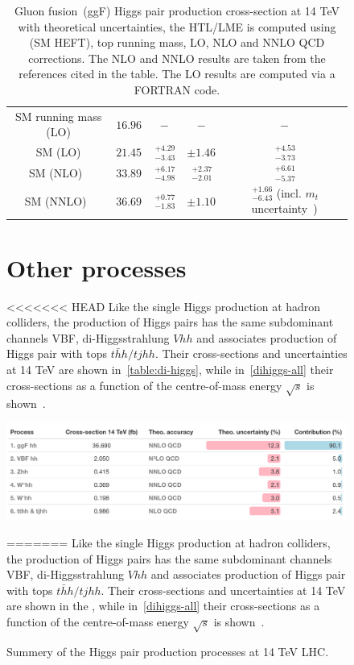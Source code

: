 \begin{figure}[!htpb]
\begin{table}
\begin{tabular}{ccccc}
		SM   running mass (LO)  &  $ 16.96$    &   $ -$   & $-$   &  $-$ \\
		SM    (LO)  &  $ 21.45$    &   $ \,^{+4.29}_{-3.43}$   & $\pm 1.46$   &  $ \,^{+4.53}_{-3.73}$ \\
		SM   (NLO)~\cite{Baglio:2012np}  &  $ 33.89$   &   $ \,^{+6.17}_{-4.98}$   & $ \,^{+2.37}_{-2.01}$   &  $ \,^{+6.61}_{-5.37}$ \\
		SM   (NNLO)~\cite{Grazzini:2018bsd}  &  $36.69$    &    $ \,^{+0.77}_{-1.83}$   & $\pm 1.10$   &  $ \,^{+1.66}_{-6.43}$ {\tiny(incl. $m_t$ uncertainty~\cite{Baglio:2020wgt})} \\
		\bottomrule
	\end{tabular}
	\caption{Gluon fusion~(ggF) Higgs pair production cross-section at 14 TeV with theoretical  uncertainties, the HTL/LME is computed using (SM HEFT), top running mass, LO, NLO and NNLO QCD corrections. The NLO and NNLO results are taken from the references cited in the table. The LO results are computed via a FORTRAN code.}
		\label{ggf_xsres}
\end{table}

\section{Other processes\label{otherhh}  }
<<<<<<< HEAD
Like the single Higgs production at hadron colliders, the production of Higgs pairs has the same subdominant channels VBF, di-Higgsstrahlung $ Vhh$ and associates production of Higgs pair with tops $t\bar hh /t j hh$. Their cross-sections and uncertainties at 14 TeV are shown in~\autoref{table:di-higgs}, while in~\autoref{dihiggs-all} their cross-sections as a function of the centre-of-mass energy $\sqrt{s}$ is shown~\cite{DiMicco:2019ngk}. 
\begin{table}[htbp!]
	\includegraphics[width=1\textwidth]{hh-table}
	\caption{ Summery of the Higgs pair production processes at 14 TeV LHC. \label{table:di-higgs} }
\end{table}
=======
Like the single Higgs production at hadron colliders, the production of Higgs pairs has the same subdominant channels VBF, di-Higgsstrahlung $ Vhh$ and associates production of Higgs pair with tops $t\bar hh /t j hh$. Their cross-sections and uncertainties at 14 TeV are shown in the , while in~\autoref{dihiggs-all} their cross-sections as a function of the centre-of-mass energy $\sqrt{s}$ is shown~\cite{DiMicco:2019ngk}. 


\end{figure}
